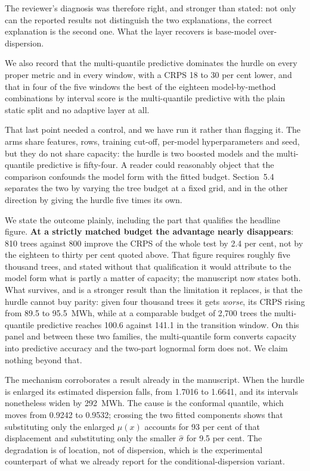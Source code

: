 \documentclass[11pt,a4paper]{article}
\begin{document}
The reviewer's diagnosis was therefore right, and stronger than stated: not only can the reported results not distinguish the two explanations, the correct explanation is the second one. What the layer recovers is base-model over-dispersion.

We also record that the multi-quantile predictive dominates the hurdle on every proper metric and in every window, with a CRPS 18 to 30 per cent lower, and that in four of the five windows the best of the eighteen model-by-method combinations by interval score is the multi-quantile predictive with the plain static split and no adaptive layer at all.

That last point needed a control, and we have run it rather than flagging it. The arms share features, rows, training cut-off, per-model hyperparameters and seed, but they do not share capacity: the hurdle is two boosted models and the multi-quantile predictive is fifty-four. A reader could reasonably object that the comparison confounds the model form with the fitted budget. Section~5.4 separates the two by varying the tree budget at a fixed grid, and in the other direction by giving the hurdle five times its own.

We state the outcome plainly, including the part that qualifies the headline figure. \textbf{At a strictly matched budget the advantage nearly disappears}: 810 trees against 800 improve the CRPS of the whole test by 2.4 per cent, not by the eighteen to thirty per cent quoted above. That figure requires roughly five thousand trees, and stated without that qualification it would attribute to the model form what is partly a matter of capacity; the manuscript now states both. What survives, and is a stronger result than the limitation it replaces, is that the hurdle cannot buy parity: given four thousand trees it gets \emph{worse}, its CRPS rising from 89.5 to 95.5~MWh, while at a comparable budget of 2{,}700 trees the multi-quantile predictive reaches 100.6 against 141.1 in the transition window. On this panel and between these two families, the multi-quantile form converts capacity into predictive accuracy and the two-part lognormal form does not. We claim nothing beyond that.

The mechanism corroborates a result already in the manuscript. When the hurdle is enlarged its estimated dispersion falls, from 1.7016 to 1.6641, and its intervals nonetheless widen by 292~MWh. The cause is the conformal quantile, which moves from 0.9242 to 0.9532; crossing the two fitted components shows that substituting only the enlarged $\mu(x)$ accounts for 93 per cent of that displacement and substituting only the smaller $\hat\sigma$ for 9.5 per cent. The degradation is of location, not of dispersion, which is the experimental counterpart of what we already report for the conditional-dispersion variant.
\end{document}
